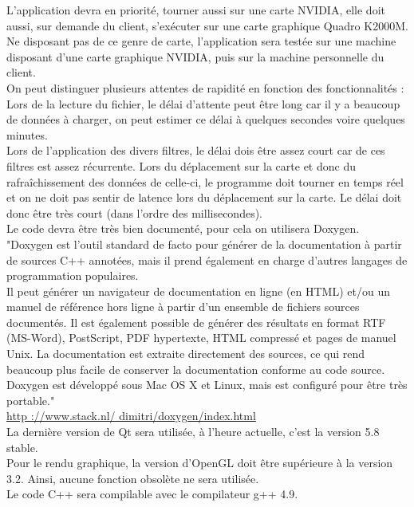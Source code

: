 \documentclass[12pt]{article}
\begin{document}
		L’application devra en priorité, tourner aussi sur une carte NVIDIA, elle doit aussi,
		sur demande du client, s’exécuter sur une carte graphique Quadro K2000M. Ne 
		disposant pas de ce genre de carte, l'application sera testée sur une machine 
		disposant d'une carte graphique NVIDIA, puis sur la machine personnelle du client. \\
		
		On peut distinguer plusieurs attentes de rapidité en fonction des fonctionnalités :
		Lors de la lecture du fichier, le délai d’attente peut être long car il y a
		beaucoup de données à charger, on peut estimer ce délai à quelques secondes voire
		quelques minutes. \\
		
		Lors de l’application des divers filtres, le délai dois être assez court car 
		de ces filtres est assez récurrente.
		Lors du déplacement sur la carte et donc du rafraîchissement des données de celle-ci,
		le programme doit tourner en temps réel et on ne doit pas sentir de latence lors du
		déplacement sur la carte. Le délai doit donc être très court (dans l’ordre des
		millisecondes).\\
		Le code devra être très bien documenté, pour cela on utilisera Doxygen.
		"Doxygen est l’outil standard de facto pour générer de la documentation à partir de
		sources C++ annotées, mais il prend également en charge d’autres langages de
		programmation populaires.\\
		Il peut générer un navigateur de documentation en ligne (en HTML) et/ou un manuel de
		référence hors ligne à partir d’un ensemble de fichiers sources documentés. Il est
		également possible de générer des résultats en format RTF (MS-Word), PostScript,
		PDF hypertexte, HTML compressé et pages de manuel Unix. La documentation est 
		extraite directement des sources, ce qui rend beaucoup plus facile de conserver
		la documentation conforme au code source. \\
		Doxygen est développé sous Mac OS X et Linux, mais est configuré pour être très
		portable."\\
		
		\url{http ://www.stack.nl/ dimitri/doxygen/index.html} \\
		
		La dernière version de Qt sera utilisée, à l’heure actuelle, c’est la version
		5.8 stable.\\
		Pour le rendu graphique, la version d’OpenGL doit être supérieure à la version 3.2.
		Ainsi, aucune fonction obsolète ne sera utilisée.\\
		Le code C++ sera compilable avec le compilateur g++ 4.9.
		
\end{document}
